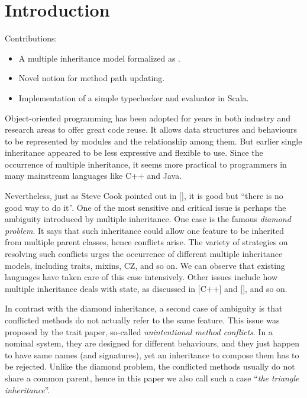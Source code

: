 \section{Introduction}

Contributions:
\begin{itemize}
    \item A multiple inheritance model formalized as \MIM.
    \item Novel notion \updates for method path updating.
    \item Implementation of a simple typechecker and evaluator in Scala.
\end{itemize}

\noindent\makebox[\linewidth]{\rule{\textwidth}{0.4pt}}

Object-oriented programming has been adopted for years in both industry and research areas to offer great code reuse.
It allows data structures and behaviours to be represented by modules and the relationship among them. But earlier
single inheritance appeared to be less expressive and flexible to use. Since the occurrence of multiple inheritance, it
seems more practical to programmers in many mainstream languages like C++ and Java.

Nevertheless, just as Steve Cook pointed out
in [], it is good but ``there is no good way to do it''.
One of the most sensitive and critical issue is perhaps the ambiguity introduced by multiple inheritance.
One case is the famous \textit{diamond problem}. It says that such inheritance could allow one feature to be inherited from
multiple parent classes, hence conflicts arise. The variety of strategies on resolving such conflicts urges the occurrence of
different multiple inheritance models, including traits, mixins, CZ, and so on. We can observe that existing languages have taken
care of this case intensively. Other issues include how multiple inheritance
deals with state, as discussed in [C++] and [], and so on.

In contrast with the diamond inheritance, a second case of ambiguity is that conflicted methods do not actually refer to the same feature.
This issue was proposed by the trait paper, so-called \textit{unintentional method conflicts}. In a nominal system, they are designed
for different behaviours, and they just happen to have same names (and signatures),
yet an inheritance to compose them has to be rejected. Unlike the
diamond problem, the conflicted methods usually do not share a common parent, hence in this paper we also call such a case ``\textit{the triangle
inheritance}''.

